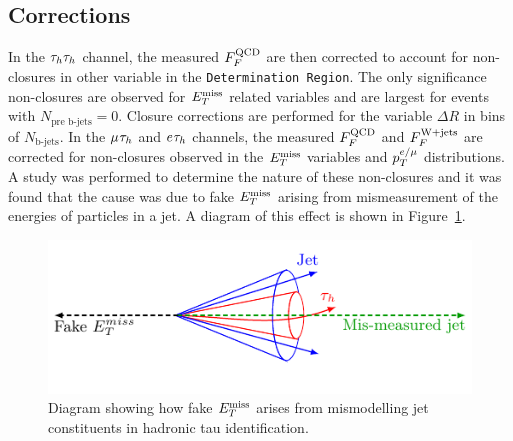 \subsection{Corrections}

In the $\tau_{h}\tau_{h}$ channel, the measured $F_{F}^{\text{QCD}}$ are then corrected to account for non-closures in other variable in the \texttt{Determination Region}. 
The only significance non-closures are observed for $E_{T}^{\text{miss}}$ related variables and are largest for events with $N_{\text{pre b-jets}}=0$. 
Closure corrections are performed for the variable $\Delta R$ in bins of $N_{\text{b-jets}}$.
In the $\mu_{}\tau_{h}$ and $e_{}\tau_{h}$ channels, the measured $F_{F}^{\text{QCD}}$ and $F_{F}^{\text{W+jets}}$ are corrected for non-closures observed in the $E_{T}^{\text{miss}}$ variables and $p_{T}^{e/\mu}$ distributions.
A study was performed to determine the nature of these non-closures and it was found that the cause was due to fake $E_{T}^{\text{miss}}$ arising from mismeasurement of the energies of particles in a jet. 
A diagram of this effect is shown in Figure~\ref{fig:fakemet}. \\

\begin{figure}[!hbtp]
\centering
   \includegraphics[width=\textwidth]{Figures/fakemet_plot.pdf}
\caption{Diagram showing how fake $E_{T}^{\text{miss}}$ arises from mismodelling jet constituents in hadronic tau identification.}
\label{fig:fakemet}
\end{figure}

